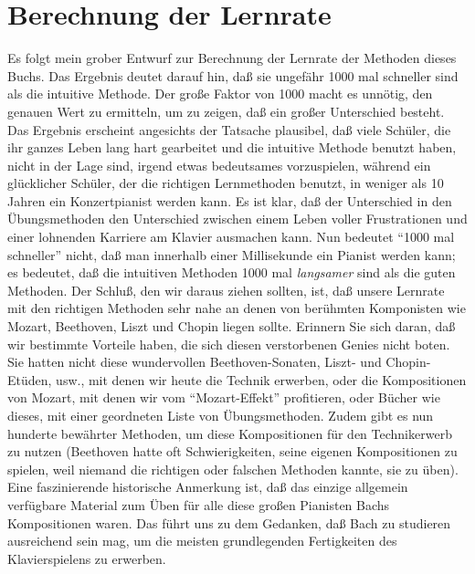 
\section{Berechnung der Lernrate}
\label{c1iv5}

Es folgt mein grober Entwurf zur Berechnung der Lernrate der Methoden dieses Buchs.
Das Ergebnis deutet darauf hin, daß sie ungefähr 1000 mal schneller sind als die intuitive Methode.
Der große Faktor von 1000 macht es unnötig, den genauen Wert zu ermitteln, um zu zeigen, daß ein großer Unterschied besteht.
Das Ergebnis erscheint angesichts der Tatsache plausibel, daß viele Schüler, die ihr ganzes Leben lang hart gearbeitet und die intuitive Methode benutzt haben, nicht in der Lage sind, irgend etwas bedeutsames vorzuspielen, während ein glücklicher Schüler, der die richtigen Lernmethoden benutzt, in weniger als 10 Jahren ein Konzertpianist werden kann.
Es ist klar, daß der Unterschied in den Übungsmethoden den Unterschied zwischen einem Leben voller Frustrationen und einer lohnenden Karriere am Klavier ausmachen kann.
Nun bedeutet \enquote{1000 mal schneller} nicht, daß man innerhalb einer Millisekunde ein Pianist werden kann; es bedeutet, daß die intuitiven Methoden 1000 mal \textit{langsamer} sind als die guten Methoden.
Der Schluß, den wir daraus ziehen sollten, ist, daß unsere Lernrate mit den richtigen Methoden sehr nahe an denen von berühmten Komponisten wie Mozart, Beethoven, Liszt und Chopin liegen sollte.
Erinnern Sie sich daran, daß wir bestimmte Vorteile haben, die sich diesen verstorbenen Genies nicht boten.
Sie hatten nicht diese wundervollen Beethoven-Sonaten, Liszt- und Chopin-Etüden, usw., mit denen wir heute die Technik erwerben, oder die Kompositionen von Mozart, mit denen wir vom \enquote{Mozart-Effekt} profitieren, oder Bücher wie dieses, mit einer geordneten Liste von Übungsmethoden.
Zudem gibt es nun hunderte bewährter Methoden, um diese Kompositionen für den Technikerwerb zu nutzen (Beethoven hatte oft Schwierigkeiten, seine eigenen Kompositionen zu spielen, weil niemand die richtigen oder falschen Methoden kannte, sie zu üben).
Eine faszinierende historische Anmerkung ist, daß das einzige allgemein verfügbare Material zum Üben für alle diese großen Pianisten Bachs Kompositionen waren.
Das führt uns zu dem Gedanken, daß Bach zu studieren ausreichend sein mag, um die meisten grundlegenden Fertigkeiten des Klavierspielens zu erwerben.

